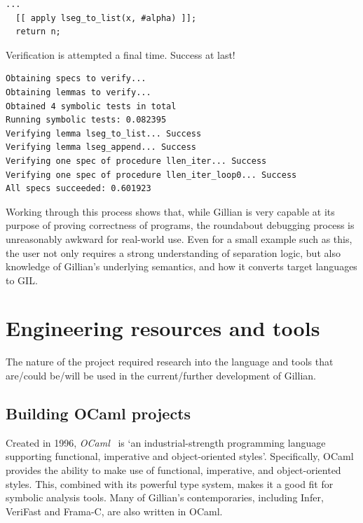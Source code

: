 \begin{lstlisting}[style=code, numbers=none, caption={Applying \texttt{lseg\_to\_list}}]
  ...
  [[ apply lseg_to_list(x, #alpha) ]];
  return n;
\end{lstlisting}

Verification is attempted a final time. Success at last!

\begin{lstlisting}[style=code, numbers=none, caption={Verification: WISL list length success}]
Obtaining specs to verify...
Obtaining lemmas to verify...
Obtained 4 symbolic tests in total
Running symbolic tests: 0.082395
Verifying lemma lseg_to_list... Success
Verifying lemma lseg_append... Success
Verifying one spec of procedure llen_iter... Success
Verifying one spec of procedure llen_iter_loop0... Success
All specs succeeded: 0.601923
\end{lstlisting}

Working through this process shows that, while Gillian is very capable at its
purpose of proving correctness of programs, the roundabout debugging process is
unreasonably awkward for real-world use. Even for a small example such as this,
the user not only requires a strong understanding of separation logic, but also
knowledge of Gillian's underlying semantics, and how it converts target
languages to GIL.\@

\section{Engineering resources and tools}\label{sec:background:engineering-tools}

The nature of the project required research into the language and tools that
are/could be/will be used in the current/further development of Gillian.

\subsection{Building OCaml projects}

Created in 1996, \textit{OCaml}~\cite{ocaml} is `an industrial-strength
programming language supporting functional, imperative and object-oriented
styles'. Specifically, OCaml provides the ability to make use of functional,
imperative, and object-oriented styles. This, combined with its powerful type
system, makes it a good fit for symbolic analysis tools. Many of Gillian's
contemporaries, including Infer, VeriFast and Frama-C, are also written in OCaml.

